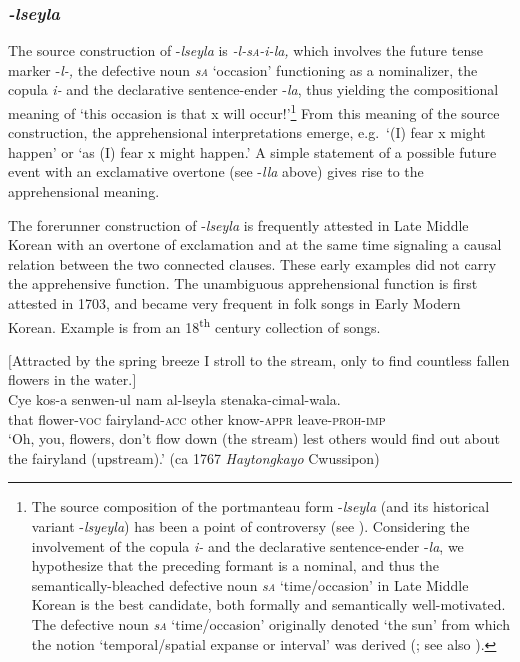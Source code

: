\documentclass[output=paper,colorlinks,citecolor=brown]{langscibook}
\begin{document}
\subsubsection{\textit{-lseyla}} 
The source construction of \nobreakdash-\textit{lseyla} is \textit{-l-s\textsc{a}-i-la,} which involves the future tense marker \nobreakdash-\textit{l-,} the defective noun \textit{s\textsc{a}} `occasion' functioning as a nominalizer, the copula \textit{i-} and the declarative sentence-ender \nobreakdash-\textit{la}, thus yielding the compositional meaning of `this occasion is that x will occur!'\footnote{The source composition of the portmanteau form \nobreakdash-\textit{lseyla} (and its historical variant \nobreakdash-\textit{lsyeyla}) has been a point of controversy (see \citealt[137--138]{Jang2002}). Considering the involvement of the copula \textit{i-} and the declarative sentence-ender \nobreakdash-\textit{la}, we hypothesize that the preceding formant is a nominal, and thus the semantically-bleached defective noun \textit{s\textsc{a}} `time/occasion' in Late Middle Korean is the best candidate, both formally and semantically well-motivated. The defective noun \textit{s\textsc{a}} `time/occasion' originally denoted `the sun' from which the notion `temporal/spatial expanse or interval' was derived (\citealt[61]{Jeong2003}; see also \citealt{RheeKoo2021}).} From this meaning of the source construction, the apprehensional interpretations emerge, e.g.\  `(I) fear x might happen' or `as (I) fear x might happen.' A simple statement of a possible future event with an exclamative overtone (see \nobreakdash-\textit{lla} above) gives rise to the apprehensional meaning. 

The forerunner construction of \nobreakdash-\textit{lseyla} is frequently attested in Late Middle Korean with an overtone of exclamation and at the same time signaling a causal relation between the two connected clauses. These early examples did not carry the apprehensive function. The unambiguous apprehensional function is first attested in 1703, and became very frequent in folk songs in Early Modern Korean. Example  is from an 18\textsuperscript{th} century collection of songs.


\ea \label{ex:RK11} \textnormal{$[$Attracted by the spring breeze I stroll to the stream, only to find countless fallen flowers in the water.$]$} \\
\gll Cye kos-a senwen-ul nam al-lseyla stenaka-cimal-wala. \\
that flower-\textsc{voc} fairyland-\textsc{acc} other know-\textsc{appr} leave-\textsc{proh-imp} \\
\glt `Oh, you, flowers, don't flow down (the stream) lest others would find out about the fairyland (upstream).' (ca 1767 \textit{Haytongkayo} Cwussipon)
\z
\end{document}

